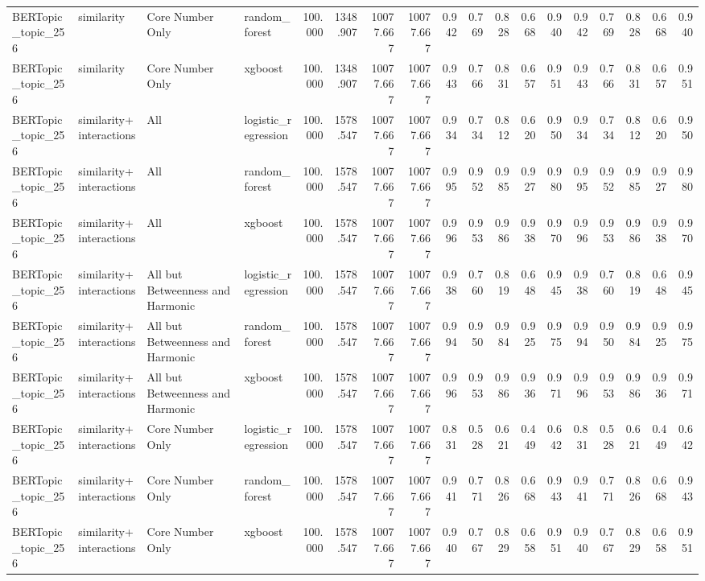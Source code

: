 \begin{tabular}{llllrrrrrrrrrrrrrr}
BERTopic_topic_256 & similarity & Core Number Only & random_forest & 100.000 & 1348.907 & 10077.667 & 10077.667 & 0.942 & 0.769 & 0.828 & 0.668 & 0.940 & 0.942 & 0.769 & 0.828 & 0.668 & 0.940 \\
BERTopic_topic_256 & similarity & Core Number Only & xgboost & 100.000 & 1348.907 & 10077.667 & 10077.667 & 0.943 & 0.766 & 0.831 & 0.657 & 0.951 & 0.943 & 0.766 & 0.831 & 0.657 & 0.951 \\
BERTopic_topic_256 & similarity+interactions & All & logistic_regression & 100.000 & 1578.547 & 10077.667 & 10077.667 & 0.934 & 0.734 & 0.812 & 0.620 & 0.950 & 0.934 & 0.734 & 0.812 & 0.620 & 0.950 \\
BERTopic_topic_256 & similarity+interactions & All & random_forest & 100.000 & 1578.547 & 10077.667 & 10077.667 & 0.995 & 0.952 & 0.985 & 0.927 & 0.980 & 0.995 & 0.952 & 0.985 & 0.927 & 0.980 \\
BERTopic_topic_256 & similarity+interactions & All & xgboost & 100.000 & 1578.547 & 10077.667 & 10077.667 & 0.996 & 0.953 & 0.986 & 0.938 & 0.970 & 0.996 & 0.953 & 0.986 & 0.938 & 0.970 \\
BERTopic_topic_256 & similarity+interactions & All but Betweenness and Harmonic & logistic_regression & 100.000 & 1578.547 & 10077.667 & 10077.667 & 0.938 & 0.760 & 0.819 & 0.648 & 0.945 & 0.938 & 0.760 & 0.819 & 0.648 & 0.945 \\
BERTopic_topic_256 & similarity+interactions & All but Betweenness and Harmonic & random_forest & 100.000 & 1578.547 & 10077.667 & 10077.667 & 0.994 & 0.950 & 0.984 & 0.925 & 0.975 & 0.994 & 0.950 & 0.984 & 0.925 & 0.975 \\
BERTopic_topic_256 & similarity+interactions & All but Betweenness and Harmonic & xgboost & 100.000 & 1578.547 & 10077.667 & 10077.667 & 0.996 & 0.953 & 0.986 & 0.936 & 0.971 & 0.996 & 0.953 & 0.986 & 0.936 & 0.971 \\
BERTopic_topic_256 & similarity+interactions & Core Number Only & logistic_regression & 100.000 & 1578.547 & 10077.667 & 10077.667 & 0.831 & 0.528 & 0.621 & 0.449 & 0.642 & 0.831 & 0.528 & 0.621 & 0.449 & 0.642 \\
BERTopic_topic_256 & similarity+interactions & Core Number Only & random_forest & 100.000 & 1578.547 & 10077.667 & 10077.667 & 0.941 & 0.771 & 0.826 & 0.668 & 0.943 & 0.941 & 0.771 & 0.826 & 0.668 & 0.943 \\
BERTopic_topic_256 & similarity+interactions & Core Number Only & xgboost & 100.000 & 1578.547 & 10077.667 & 10077.667 & 0.940 & 0.767 & 0.829 & 0.658 & 0.951 & 0.940 & 0.767 & 0.829 & 0.658 & 0.951 \\

\end{tabular}
